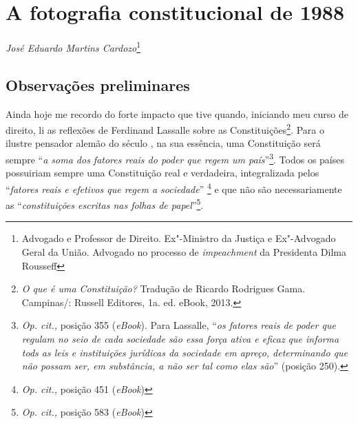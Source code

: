 \chapter{A fotografia constitucional de 1988}

\emph{José Eduardo Martins Cardozo}\footnote{Advogado e
Professor de Direito. Ex"-Ministro da Justiça e Ex"-Advogado
Geral da União. Advogado no processo de \emph{impeachment} da Presidenta
Dilma Rousseff}

\section{Observações preliminares}

Ainda hoje me recordo do forte impacto que tive quando, iniciando meu
curso de direito, li as reflexões de Ferdinand Lassalle sobre as
Constituições\footnote{\emph{O que é uma Constituição?} Tradução de
  Ricardo Rodrigues Gama. Campinas/: Russell Editores, 1a. ed. eBook,
  2013.}. Para o ilustre pensador alemão do século , na sua essência,
uma Constituição será sempre ``\emph{a soma dos fatores reais do poder
que regem um país}''\footnote{\emph{Op. cit.,} posição 355
  (\emph{eBook}). Para Lassalle, ``\emph{os fatores reais de poder que
  regulam no seio de cada sociedade são essa força ativa e eficaz que
  informa tods as leis e instituições jurídicas da sociedade em apreço,
  determinando que não possam ser, em substância, a não ser tal como
  elas são}'' (posição 250).}. Todos os países possuiriam sempre uma
Constituição real e verdadeira, integralizada pelos ``\emph{fatores
reais e efetivos que regem a sociedade}'' \footnote{\emph{Op. cit.,}
  posição 451 (\emph{eBook})} e que não são necessariamente as
``\emph{constituições escritas nas folhas de papel}''\footnote{\emph{Op.
  cit.,} posição 583 (\emph{eBook})}.

